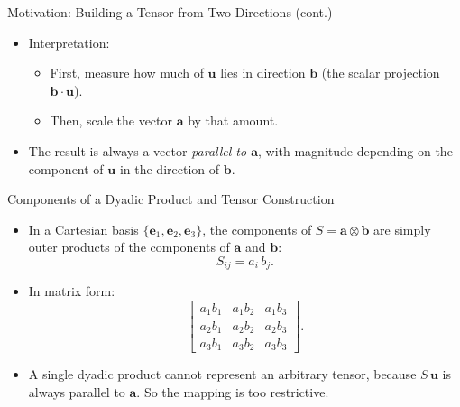 \documentclass[aspectratio=169,11pt]{beamer}
\begin{document}
\begin{frame}{Motivation: Building a Tensor from Two Directions (cont.)}
\begin{itemize}
    \item Interpretation:
          \begin{itemize}
              \item First, measure how much of $\mathbf{u}$ lies in direction
                    $\mathbf{b}$ (the scalar projection $\mathbf{b}\cdot\mathbf{u}$).
              \item Then, scale the vector $\mathbf{a}$ by that amount.
          \end{itemize}

    \item The result is always a vector \emph{parallel to $\mathbf{a}$}, with
          magnitude depending on the component of $\mathbf{u}$ in the
          direction of $\mathbf{b}$.

\end{itemize}

\end{frame}

\begin{frame}{Components of a Dyadic Product and Tensor Construction}

\begin{itemize}

    \item In a Cartesian basis $\{\mathbf{e}_1,\mathbf{e}_2,\mathbf{e}_3\}$,
          the components of $S = \mathbf{a} \otimes \mathbf{b}$ are simply
          outer products of the components of $\mathbf{a}$ and $\mathbf{b}$:
          \[
              S_{ij} = a_i\, b_j.
          \]

    \item In matrix form:
          \[
          \begin{bmatrix}
              a_1 b_1 & a_1 b_2 & a_1 b_3 \\
              a_2 b_1 & a_2 b_2 & a_2 b_3 \\
              a_3 b_1 & a_3 b_2 & a_3 b_3
          \end{bmatrix}.
          \]

    \item A single dyadic product cannot represent an arbitrary tensor,
          because $S\,\mathbf{u}$ is always parallel to $\mathbf{a}$.
          So the mapping is too restrictive.
    \end{itemize}
\end{frame}
\end{document}
